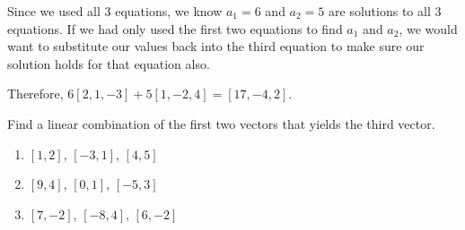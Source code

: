 Since we used all 3 equations, we know $a_1 = 6$ and $a_2 = 5$ are solutions 
to all 3 equations. If we had only used the first two equations to find $a_1$ 
and $a_2$, we would want to substitute our values back into the third equation 
to make sure our solution holds for that equation also. 

Therefore, $6 \left[ 2, 1, -3 \right] + 5 \left[ 1, -2, 4 \right] = \left[ 17, 
-4, 2 \right]$.

\begin{Exercise}[title = {Linear Combinations}, label = combo]
Find a linear combination of the first two vectors that yields the third 
vector. 
\begin{enumerate}
\item $\left[1, 2 \right]$, $\left[ -3, 1 \right]$, $\left[ 4, 5 \right]$
\item $\left[ 9, 4 \right]$, $\left[ 0, 1 \right]$, $\left[ -5, 3 \right]$
\item $\left[ 7, -2 \right]$, $\left[ -8, 4 \right]$, $\left[ 6, -2 \right]$
\end{enumerate}
\vspace{50mm}
\end{Exercise}


